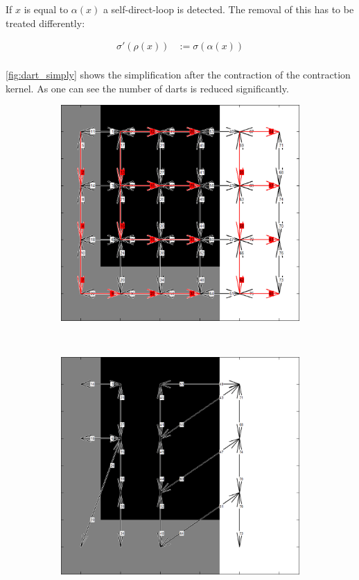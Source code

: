 \documentclass[12pt]{article}
\begin{document}
If \( x \) is equal to \( \alpha(x) \) a self-direct-loop is detected. The removal of this has to be treated differently:

\begin{align}
  \sigma'(\rho(x))  &:= \sigma(\alpha(x)) \\
\end{align}

\cref{fig:dart_simply} shows the simplification after the contraction of the contraction kernel. As one can see the number of darts is reduced significantly.

\begin{figure}[tb]
  \centering

    \begin{subfigure}[b]{0.3\textwidth}
      \includegraphics[width=\textwidth]{img/simply2.jpg}
      \caption{}\label{fig:dart_simply2}
    \end{subfigure}~%
    \begin{subfigure}[b]{0.3\textwidth}
      \includegraphics[width=\textwidth]{img/simply3.jpg}

\end{subfigure}
\end{figure}
\end{document}
